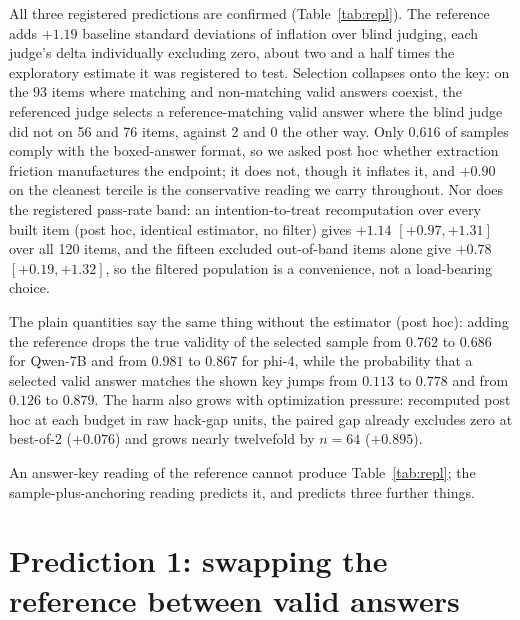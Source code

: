 \documentclass[11pt]{article}
\begin{document}
All three registered predictions are confirmed (Table~\ref{tab:repl}).
The reference adds $+1.19$ baseline standard deviations of inflation over blind judging, each judge's delta individually excluding zero, about two and a half times the exploratory estimate it was registered to test.
Selection collapses onto the key: on the 93 items where matching and non-matching valid answers coexist, the referenced judge selects a reference-matching valid answer where the blind judge did not on 56 and 76 items, against 2 and 0 the other way.
Only $0.616$ of samples comply with the boxed-answer format, so we asked post hoc whether extraction friction manufactures the endpoint; it does not, though it inflates it, and $+0.90$ on the cleanest tercile is the conservative reading we carry throughout.
Nor does the registered pass-rate band: an intention-to-treat recomputation over every built item (post hoc, identical estimator, no filter) gives $+1.14$ $[+0.97, +1.31]$ over all 120 items, and the fifteen excluded out-of-band items alone give $+0.78$ $[+0.19, +1.32]$, so the filtered population is a convenience, not a load-bearing choice.

The plain quantities say the same thing without the estimator (post hoc): adding the reference drops the true validity of the selected sample from $0.762$ to $0.686$ for Qwen-7B and from $0.981$ to $0.867$ for phi-4, while the probability that a selected valid answer matches the shown key jumps from $0.113$ to $0.778$ and from $0.126$ to $0.879$.
The harm also grows with optimization pressure: recomputed post hoc at each budget in raw hack-gap units, the paired gap already excludes zero at best-of-2 ($+0.076$) and grows nearly twelvefold by $n{=}64$ ($+0.895$).

An answer-key reading of the reference cannot produce Table~\ref{tab:repl}; the sample-plus-anchoring reading predicts it, and predicts three further things.

\section{Prediction 1: swapping the reference between valid answers}
\label{sec:p1}
\end{document}
